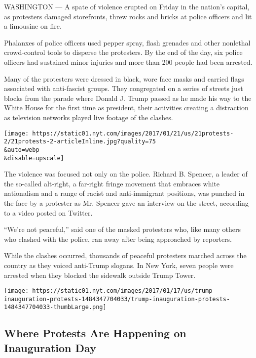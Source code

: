 WASHINGTON --- A spate of violence erupted on Friday in the nation's
capital, as protesters damaged storefronts, threw rocks and bricks at
police officers and lit a limousine on fire.

Phalanxes of police officers used pepper spray, flash grenades and other
nonlethal crowd-control tools to disperse the protesters. By the end of
the day, six police officers had sustained minor injuries and more than
200 people had been arrested.

Many of the protesters were dressed in black, wore face masks and
carried flags associated with anti-fascist groups. They congregated on a
series of streets just blocks from the parade where Donald J. Trump
passed as he made his way to the White House for the first time as
president, their activities creating a distraction as television
networks played live footage of the clashes.

\texttt{[image: https://static01.nyt.com/images/2017/01/21/us/21protests-2/21protests-2-articleInline.jpg?quality=75\\\&auto=webp\\\&disable=upscale]}

The violence was focused not only on the police. Richard B. Spencer, a
leader of the so-called alt-right, a far-right fringe movement that
embraces white nationalism and a range of racist and anti-immigrant
positions, was punched in the face by a protester as Mr. Spencer gave an
interview on the street, according to a video posted on Twitter.

``We're not peaceful,'' said one of the masked protesters who, like many
others who clashed with the police, ran away after being approached by
reporters.

While the clashes occurred, thousands of peaceful protesters marched
across the country as they voiced anti-Trump slogans. In New York, seven
people were arrested when they blocked the sidewalk outside Trump Tower.

\href{https://www.nytimes.com/interactive/2017/01/17/us/inauguration-protests.html}{}

\texttt{[image: https://static01.nyt.com/images/2017/01/17/us/trump-inauguration-protests-1484347704033/trump-inauguration-protests-1484347704033-thumbLarge.png]}

\hypertarget{where-protests-are-happening-on-inauguration-day}{%
\subsection{Where Protests Are Happening on Inauguration
Day}\label{where-protests-are-happening-on-inauguration-day}}

